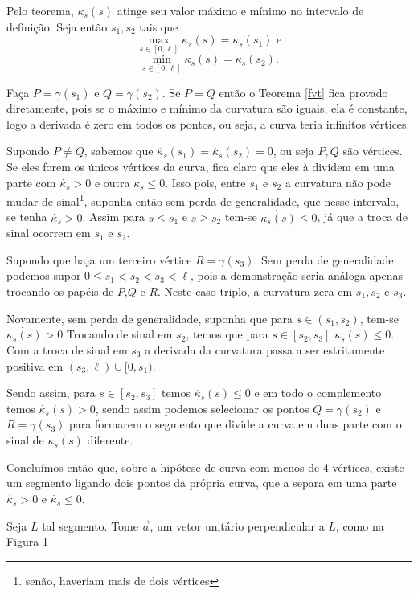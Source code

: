 \documentclass[12pt,letterpaper]{article}
\begin{document}
	Pelo teorema, $\kappa_s(s)$ atinge seu valor máximo e mínimo no intervalo de definição. Seja então $s_1,s_2$ tais que
	 $$\displaystyle\max_{s\in[0,\ell]}\kappa_s(s)=\kappa_s(s_1)\text{ e}$$ 
	  $$\displaystyle\min_{s\in[0,\ell]}\kappa_s(s)=\kappa_s(s_2).$$
	
	Faça $P=\gamma(s_1)$ e $Q=\gamma(s_2)$. Se $P=Q$ então o Teorema \ref{fvt} fica provado diretamente, pois se o máximo e mínimo da curvatura são iguais, ela é constante, logo a derivada é zero em todos os pontos, ou seja, a curva teria infinitos vértices.
	
	Supondo $P\neq Q$, sabemos que $\dot{\kappa_s}(s_1)=\dot{\kappa_s}(s_2)=0$, ou seja $P,Q$ são vértices. Se eles forem os únicos vértices da curva, fica claro que eles à dividem em uma parte com $\dot{\kappa_s}>0$ e outra $\dot{\kappa_s}\leq0$. Isso pois, entre $s_1$ e $s_2$ a curvatura não pode mudar de sinal\footnote{senão, haveriam mais de dois vértices}, suponha então sem perda de generalidade, que nesse intervalo, se tenha $\dot{\kappa_s}>0$. Assim para $s\leq s_1$ e $s\geq s_2$ tem-se $\dot{\kappa_s(s)}\leq0$, já que a troca de sinal ocorrem em $s_1$ e $s_2$.
	
	Supondo que haja um terceiro vértice $R=\gamma(s_3)$. Sem perda de generalidade podemos supor $0\leq s_1<s_2<s_3<\ell$, pois a demonstração seria análoga apenas trocando os papéis de $P$,$Q$ e $R$. Neste caso triplo, a curvatura zera em $s_1,s_2$ e $s_3$.
	
	Novamente, sem perda de generalidade, suponha que para $s\in(s_1,s_2)$, tem-se $\dot{\kappa_s(s)}>0$ Trocando de sinal em $s_2$, temos que para $s\in[s_2,s_3]$ $\dot{\kappa_s(s)}\leq0$. Com a troca de sinal em $s_3$ a derivada da curvatura passa a ser estritamente positiva em $(s_3,\ell)\cup[0,s_1)$.
	
	Sendo assim, para $s\in[s_2,s_3]$ temos $\dot{\kappa_s}(s)\leq0$ e em todo o complemento temos $\dot{\kappa_s}(s)>0$, sendo assim podemos selecionar os pontos $Q=\gamma(s_2)$ e $R=\gamma(s_3)$ para formarem o segmento que divide a curva em duas parte com o sinal de $\dot{\kappa_s(s)}$ diferente.
	
	Concluímos então que, sobre a hipótese de curva com menos de 4 vértices, existe um segmento ligando dois pontos da própria curva, que a separa em uma parte $\dot{\kappa_s}>0$ e $\dot{\kappa_s}\leq0$.
	
	Seja $L$ tal segmento. Tome $\vec a$, um vetor unitário perpendicular a $L$, como na Figura 1
	
\end{document}
